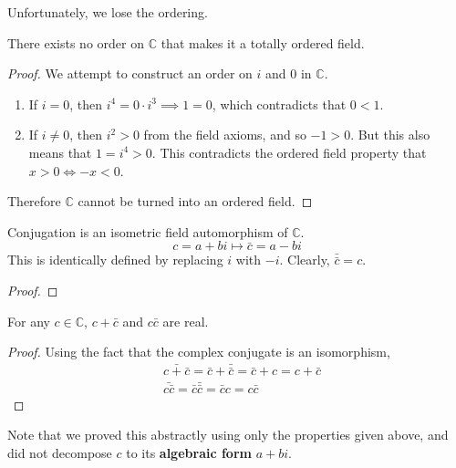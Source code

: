   Unfortunately, we lose the ordering. 

  \begin{theorem}
    There exists no order on $\mathbb{C}$ that makes it a totally ordered field.
  \end{theorem}
  \begin{proof}
    We attempt to construct an order on $i$ and $0$ in $\mathbb{C}$. 
    \begin{enumerate}
      \item If $i = 0$, then $i^4 = 0 \cdot i^3 \implies 1 = 0$, which contradicts that $0 < 1$. 
      \item If $i \neq 0$, then $i^2 > 0$ from the field axioms, and so $-1 > 0$. But this also means that $1 = i^4 > 0$. This contradicts the ordered field property that $x > 0 \iff -x < 0$. 
    \end{enumerate}
    Therefore $\mathbb{C}$ cannot be turned into an ordered field. 
  \end{proof}

  \begin{theorem}
    Conjugation is an isometric field automorphism of $\mathbb{C}$. 
    \begin{equation}
      c = a + b i \mapsto \bar{c} = a - b i
    \end{equation}
    This is identically defined by replacing $i$ with $-i$. Clearly, $\bar{\bar{c}} = c$. 
  \end{theorem}
  \begin{proof}
    
  \end{proof}

  \begin{proposition}
    For any $c \in \mathbb{C}$, $c + \bar{c}$ and $c \bar{c}$ are real. 
  \end{proposition}
  \begin{proof}
    Using the fact that the complex conjugate is an isomorphism, 
    \begin{align*}
      & \bar{c + \bar{c}} = \bar{c} + \bar{\bar{c}} = \bar{c} + c = c + \bar{c} \\
      & \bar{ c \bar{c}} = \bar{c} \bar{\bar{c}} = \bar{c} c = c \bar{c}
    \end{align*}
  \end{proof}
  Note that we proved this abstractly using only the properties given above, and did not decompose $c$ to its \textbf{algebraic form} $a + b i$. 

